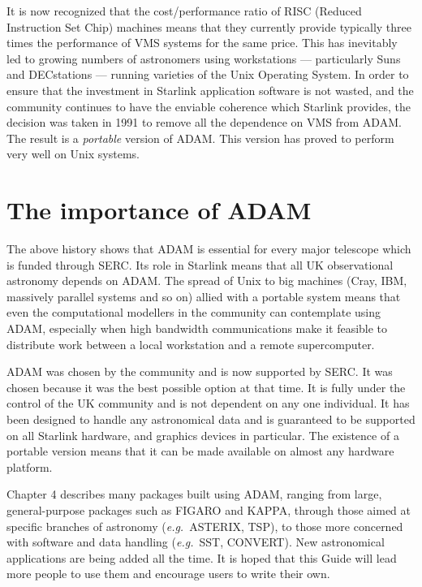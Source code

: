 It is now recognized that the cost/performance ratio of RISC (Reduced
Instruction Set Chip) machines means that they currently provide
typically three times the performance of VMS systems for the same price.
This has inevitably led to growing numbers of astronomers using workstations ---
particularly Suns and DECstations --- running varieties of the Unix Operating
System.
In order to ensure that the investment in Starlink application software is not
wasted, and the community continues to have the enviable coherence which
Starlink provides, the decision was taken in 1991 to remove all the dependence
on VMS from ADAM.
The result is a {\em portable} version of ADAM.
This version has proved to perform very well on Unix systems.

\section*{The importance of ADAM}
\label{S_impadam}

The above history shows that ADAM is essential for every major telescope
which is funded through SERC.
Its role in Starlink means that all UK observational astronomy depends on ADAM.
The spread of Unix to big machines (Cray, IBM, massively parallel systems and
so on) allied with a portable system means that even the computational
modellers in the community can contemplate using ADAM, especially when high
bandwidth communications make it feasible to distribute work between a
local workstation and a remote supercomputer.

ADAM was chosen by the community and is now supported by SERC.
It was chosen because it was the best possible option at that time.
It is fully under the control of the UK community and is not dependent on any
one individual.
It has been designed to handle any astronomical data and is guaranteed to be
supported on all Starlink hardware, and graphics devices in particular.
The existence of a portable version means that it can be made available on
almost any hardware platform.

Chapter 4 describes many packages built using ADAM, ranging from large,
general-purpose packages such as FIGARO and KAPPA, through those aimed at
specific branches of astronomy ({\it e.g.}\ ASTERIX, TSP), to those more
concerned with software and data handling ({\it e.g.}\ SST, CONVERT).
New astronomical applications are being added all the time.
It is hoped that this Guide will lead more people to use them and encourage
users to write their own.
